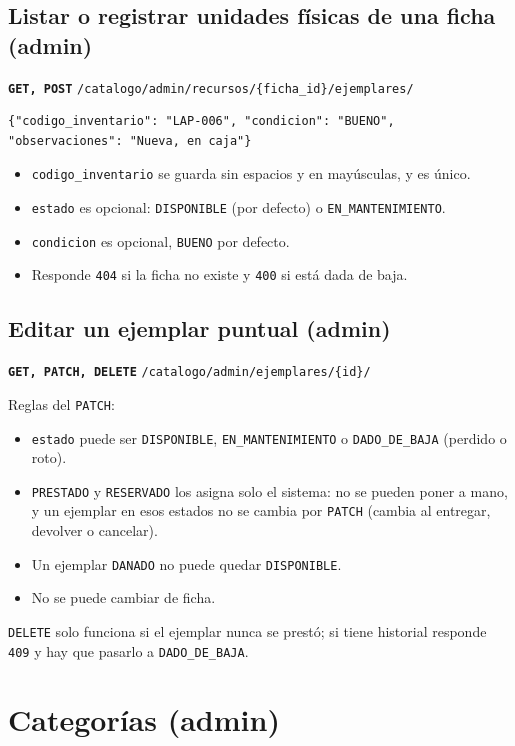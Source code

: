 \documentclass[11pt]{article}
\newcommand{\us}{\_\allowbreak}
\newcommand{\metodo}[2]{\textbf{\texttt{#1}} \texttt{#2}}
\begin{document}
\subsection*{Listar o registrar unidades f\'isicas de una ficha (admin)}
\metodo{GET, POST}{/catalogo/admin/recursos/\{ficha\us id\}/ejemplares/}
\begin{lstlisting}
{"codigo_inventario": "LAP-006", "condicion": "BUENO", "observaciones": "Nueva, en caja"}
\end{lstlisting}
\begin{itemize}
    \item \texttt{codigo\us inventario} se guarda sin espacios y en may\'usculas, y es \'unico.
    \item \texttt{estado} es opcional: \texttt{DISPONIBLE} (por defecto) o \texttt{EN\us MANTENIMIENTO}.
    \item \texttt{condicion} es opcional, \texttt{BUENO} por defecto.
    \item Responde \texttt{404} si la ficha no existe y \texttt{400} si est\'a dada de baja.
\end{itemize}

\subsection*{Editar un ejemplar puntual (admin)}
\metodo{GET, PATCH, DELETE}{/catalogo/admin/ejemplares/\{id\}/}

Reglas del \texttt{PATCH}:
\begin{itemize}
    \item \texttt{estado} puede ser \texttt{DISPONIBLE}, \texttt{EN\us MANTENIMIENTO} o \texttt{DADO\us DE\us BAJA} (perdido o roto).
    \item \texttt{PRESTADO} y \texttt{RESERVADO} los asigna solo el sistema: no se pueden poner a mano, y un ejemplar en esos estados no se cambia por \texttt{PATCH} (cambia al entregar, devolver o cancelar).
    \item Un ejemplar \texttt{DANADO} no puede quedar \texttt{DISPONIBLE}.
    \item No se puede cambiar de ficha.
\end{itemize}
\texttt{DELETE} solo funciona si el ejemplar nunca se prest\'o; si tiene historial responde \texttt{409} y hay que pasarlo a \texttt{DADO\us DE\us BAJA}.

\section{Categor\'ias (admin)}
\end{document}
